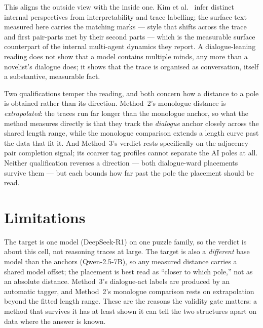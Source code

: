 \documentclass[10pt,twocolumn]{article}
\begin{document}
This aligns the outside view with the inside one. Kim et al.~\cite{kim2026} infer distinct internal
perspectives from interpretability and trace labelling; the surface text measured here carries the
matching marks --- style that shifts across the trace and first pair-parts met by their second
parts --- which is the measurable surface counterpart of the internal multi-agent dynamics they
report. A dialogue-leaning reading does not show that a model contains multiple minds, any more than
a novelist's dialogue does; it shows that the trace is organised as conversation, itself a
substantive, measurable fact.

Two qualifications temper the reading, and both concern how a distance to a pole is obtained rather
than its direction. Method~2's monologue distance is \emph{extrapolated}: the traces run far longer
than the monologue anchor, so what the method measures directly is that they track the
\emph{dialogue} anchor closely across the shared length range, while the monologue comparison
extends a length curve past the data that fit it. And Method~3's verdict rests specifically on the
adjacency-pair completion signal; its coarser tag profiles cannot separate the AI poles at all.
Neither qualification reverses a direction --- both dialogue-ward placements survive them --- but
each bounds how far past the pole the placement should be read.

\section{Limitations}
The target is one model (DeepSeek-R1) on one puzzle family, so the verdict is about this cell, not
reasoning traces at large. The target is also a \emph{different} base model than the anchors
(Qwen-2.5-7B), so any measured distance carries a shared model offset; the placement is best read
as ``closer to which pole,'' not as an absolute distance. Method~3's dialogue-act labels are
produced by an automatic tagger, and Method~2's monologue comparison rests on extrapolation beyond
the fitted length range. These are the reasons the validity gate matters: a method that survives it
has at least shown it can tell the two structures apart on data where the answer is known.
\end{document}
